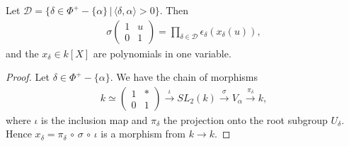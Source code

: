 \begin{proposition} \label{claim1}
Let $\mathcal{D} = \{\delta \in \Phi^+-\{\alpha\}\,|\, \langle \delta, \alpha \rangle > 0\}$. Then
\begin{align*}
\sigma\left(\begin{matrix} 1 & u \\ 0 & 1 \end{matrix}\right) = \prod_{\delta\in\mathcal{D}} \epsilon_\delta\left(x_\delta\left(u\right)\right),
\end{align*}
and the $x_\delta\in k[X]$ are polynomials in one variable.
\end{proposition}
\begin{proof}
Let $\delta \in \Phi^+-\{\alpha\}$. We have the chain of morphisms
\begin{align*}
k\simeq \left(\begin{matrix}1 & * \\ 0 & 1\end{matrix}\right)
\stackrel{\iota}\longrightarrow SL_2(k) 
\stackrel{\sigma}\longrightarrow V_\alpha 
\stackrel{\pi_\delta}\longrightarrow k,
\end{align*}
where $\iota$ is the inclusion map and $\pi_\delta$ the projection onto the root subgroup $U_\delta$. Hence  $x_\delta = \pi_\delta\, \circ\, \sigma\, \circ\, \iota$ is a morphism from $k \rightarrow k$.


\end{proof}
